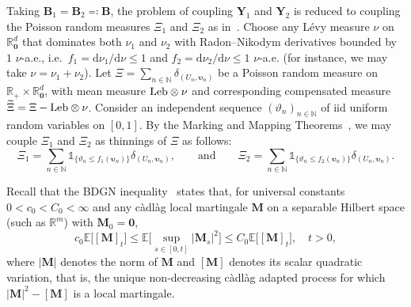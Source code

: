 \documentclass[en,oneside,bbfont,article]{amsart}
\theoremstyle{remark}
\theoremstyle{definition}
\theoremstyle{definition}
\newcommand\N{\mathbb{N}}
\newcommand\R{\mathbb{R}}
\newcommand\E{\mathds{E}}
\newcommand\1{\mathds{1}}
\newcommand{\Leb}{\text{\normalfont Leb}}
\renewcommand\le{\leqslant}
\newcommand{\D}{\mathrm{d}}
\newcommand{\wt}[1]{\widetilde{#1}}
\begin{document}
Taking $\bm B_1=\bm B_2\eqqcolon \bm B$, the problem of coupling $\bm{Y}_1$ and $\bm{Y}_2$ is reduced to coupling the Poisson random measures $\Xi_1$ and $\Xi_2$ as in~\cite[Sec.~3.1]{WassersteinPaper}. Choose any L\'evy measure $\nu$ on $\R^d_{\bm0}$ that dominates both $\nu_1$ and $\nu_2$ with Radon--Nikodym derivatives bounded by $1$ $\nu$-a.e., i.e.\ $f_1=\D \nu_1/\D\nu\le 1$ and $f_2=\D \nu_2/\D\nu\le 1$ $\nu$-a.e. (for instance, we may take $\nu=\nu_1+\nu_2$). Let $\Xi=\sum_{n\in\N} \delta_{(U_n,\bm{\upsilon}_n)}$ be a Poisson random measure on $\R_+\times\R^d_{\bm 0}$, with mean measure $\Leb\otimes\nu$ and corresponding compensated measure $\wt\Xi=\Xi-\Leb\otimes\nu$. Consider an independent sequence $(\vartheta_n)_{n\in\N}$ of iid uniform random variables on $[0,1]$. By the Marking and Mapping Theorems~\cite{MR1207584}, we may couple $\Xi_1$ and $\Xi_2$ as thinnings of $\Xi$ as follows:
\begin{equation}\label{eq:thining_coupling_defn}
\Xi_1
=\sum_{n\in\N} \1_{\{\vartheta_n\le f_1(\bm{\upsilon}_n)\}}\delta_{(U_n,\bm{\upsilon}_n)},
\qquad\text{and}\qquad
\Xi_2
=\sum_{n\in\N} \1_{\{\vartheta_n\le f_2(\bm{\upsilon}_n)\}}\delta_{(U_n,\bm{\upsilon}_n)}.
\end{equation}

Recall that the BDGN inequality~\cite[Thm~1.1]{MR3463679} states that, for universal constants $0<c_0<C_0<\infty$ and any c\`{a}dl\`{a}g local martingale $\bm{M}$ on a separable Hilbert space (such as $\R^m$) with $\bm{M}_0=\bm{0}$, 
\begin{equation}
\label{eq:BDGN}
c_0\E\big[[\bm{M}]_t\big]
\le \E\bigg[\sup_{s\in[0,t]}|\bm{M}_s|^2\bigg]
\le C_0\E\big[[\bm{M}]_t\big],
\quad t>0,
\end{equation}
where $|\bm{M}|$ denotes the norm of $\bm{M}$ and $[\bm{M}]$ denotes its scalar quadratic variation, that is, the unique non-decreasing c\`{a}dl\`{a}g adapted process for which $|\bm{M}|^2-[\bm{M}]$ is a local martingale.
\end{document}
